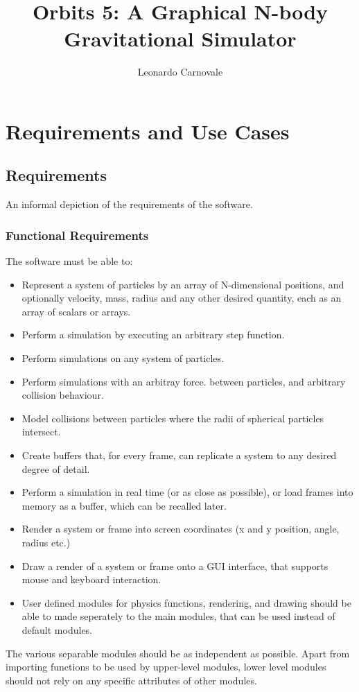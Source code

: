 \documentclass{report}
\title{Orbits 5: A Graphical N-body Gravitational Simulator}
\author{Leonardo Carnovale}
\begin{document}
  \maketitle

  \tableofcontents
  \chapter{Requirements and Use Cases}
  \section{Requirements}
      An informal depiction of the requirements of the software.
      \subsection{Functional Requirements}
        The software must be able to:
        \begin{itemize}
          \item Represent a system of particles by an array of
            N-dimensional positions, and optionally velocity, mass,
            radius and any other desired quantity, each as an array of
            scalars or arrays.
          \item Perform a simulation by executing an arbitrary step
            function.
          \item Perform simulations on any system of particles.
          \item Perform simulations with an arbitray force.
            between particles, and arbitrary collision behaviour.
          \item Model collisions between particles where the radii
            of spherical particles intersect.
          \item 
            Create buffers that, for every frame, can replicate a system to
            any desired degree of detail. 
          \item 
            Perform a simulation in real time (or as close as possible), or load frames
            into memory as a buffer, which can be recalled later.
          \item 
            Render a system or frame into screen coordinates 
            (x and y position, angle, radius etc.)
          \item 
            Draw a render of a system or frame onto a GUI interface, that supports mouse and keyboard
            interaction.
          \item 
            User defined modules for physics functions, rendering, and drawing should be able to
            made seperately to the main modules, that can be used instead of default modules.
        \end{itemize}
        The various separable modules should be as independent as possible. Apart from importing
        functions to be used by upper-level modules, lower level modules should not rely
        on any specific attributes of other modules. 
\end{document}
